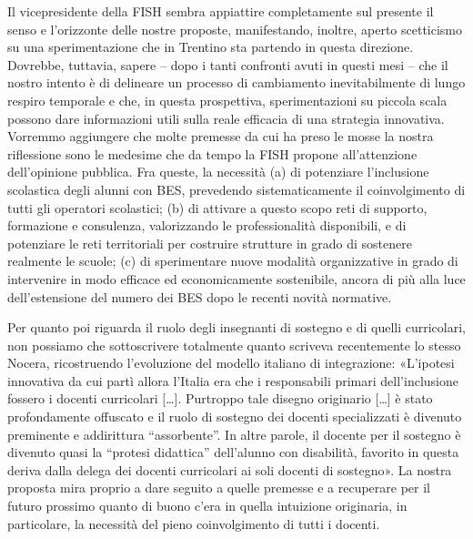 Il vicepresidente della FISH sembra appiattire completamente sul presente il senso e l’orizzonte delle nostre proposte, manifestando, inoltre, aperto scetticismo su una sperimentazione che in Trentino sta partendo in questa direzione. Dovrebbe, tuttavia, sapere – dopo i tanti confronti avuti in questi mesi – che il nostro intento è di delineare un processo di cambiamento inevitabilmente di lungo respiro temporale e che, in questa prospettiva, sperimentazioni su piccola scala possono dare informazioni utili sulla reale efficacia di una strategia innovativa.
Vorremmo aggiungere che molte premesse da cui ha preso le mosse la nostra riflessione sono le medesime che da tempo la FISH propone all’attenzione dell’opinione pubblica. Fra queste, la necessità (a) di potenziare l’inclusione scolastica degli alunni con BES, prevedendo sistematicamente il coinvolgimento di tutti gli operatori scolastici; (b) di attivare a questo scopo reti di supporto, formazione e consulenza, valorizzando le professionalità disponibili, e di potenziare le reti territoriali per costruire strutture in grado di sostenere realmente le scuole; (c) di sperimentare nuove modalità organizzative in grado di intervenire in modo efficace ed economicamente sostenibile, ancora di più alla luce dell’estensione del numero dei BES dopo le recenti novità normative.

Per quanto poi riguarda il ruolo degli insegnanti di sostegno e di quelli curricolari, non possiamo che sottoscrivere totalmente quanto scriveva recentemente lo stesso Nocera, ricostruendo l’evoluzione del modello italiano di integrazione: «L’ipotesi innovativa da cui partì allora l’Italia era che i responsabili primari dell’inclusione fossero i docenti curricolari […]. Purtroppo tale disegno originario […] è stato profondamente offuscato e il ruolo di sostegno dei docenti specializzati è divenuto preminente e addirittura “assorbente”. In altre parole, il docente per il sostegno è divenuto quasi la “protesi didattica” dell’alunno con disabilità, favorito in questa deriva dalla delega dei docenti curricolari ai soli docenti di sostegno».
La nostra proposta mira proprio a dare seguito a quelle premesse e a recuperare per il futuro prossimo quanto di buono c’era in quella intuizione originaria, in particolare, la necessità del pieno coinvolgimento di tutti i docenti.


